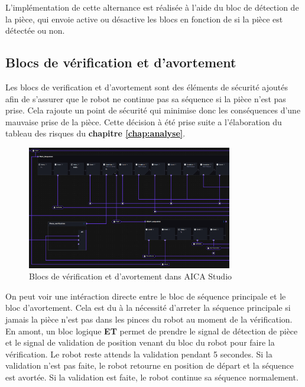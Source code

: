 L'implémentation de cette alternance est réalisée à l'aide du bloc de détection de la pièce, qui envoie active ou désactive les blocs en fonction de si la pièce est détectée ou non.


\subsection{Blocs de vérification et d'avortement}

Les blocs de verification et d'avortement sont des éléments de sécurité ajoutés afin de s'assurer que le robot ne continue pas sa séquence si la pièce n'est pas prise. Cela rajoute un point de sécurité qui minimise donc les conséquences d'une mauvaise prise de la pièce.  Cette décision à été prise suite a l'élaboration du tableau des risques du \textbf{chapitre \ref{chap:analyse}}.

\begin{figure}[H]
    \centering
    \includegraphics[width=0.8\textwidth]{assets/figures/AICA_Abort_sequence.png}
    \caption{Blocs de vérification et d'avortement dans AICA Studio}
    \label{fig:verification_block}
\end{figure}

On peut voir une intéraction directe entre le bloc de séquence principale et le bloc d'avortement. Cela est du à la nécessité d'arreter la séquence principale si jamais la pièce n'est pas dans les pinces du robot au moment de la vérification. En amont, un bloc logique \textbf{ET} permet de prendre le signal de détection de pièce et le signal de validation de position venant du bloc du robot pour faire la vérification. Le robot reste attends la validation pendant 5 secondes. Si la validation n'est pas faite, le robot retourne en position de départ et la séquence est avortée. Si la validation est faite, le robot continue sa séquence normalement.



